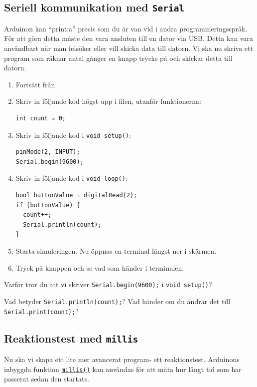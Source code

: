 \documentclass[11pt]{article}
\begin{document}
\newpage
\subsection{Seriell kommunikation med \texttt{Serial}}\label{sec:serial}
Arduinon kan ``print:a'' precis som du är van vid i andra programmeringsspråk.
För att göra detta måste den vara ansluten till en dator via USB. Detta kan
vara
användbart när man felsöker eller vill skicka data till datorn. Vi ska nu
skriva ett program som räknar antal gånger en knapp trycks på och skickar detta
till datorn.

\begin{enumerate}
      \item
            Fortsätt från 
      \item Skriv in följande kod högst upp i filen, utanför funktionerna:
            \begin{lstlisting}
int count = 0;
            \end{lstlisting}
      \item Skriv in följande kod i \texttt{void setup()}:
            \begin{lstlisting}
pinMode(2, INPUT);
Serial.begin(9600);
            \end{lstlisting}
      \item Skriv in följande kod i \texttt{void loop()}:
            \begin{lstlisting}
bool buttonValue = digitalRead(2);
if (buttonValue) {
  count++;
  Serial.println(count);
}
            \end{lstlisting}
      \item Starta simuleringen. Nu öppnas en terminal längst ner i skärmen.
      \item Tryck på knappen och se vad som händer i terminalen.
\end{enumerate}
\vspace{1em}
Varför tror du att vi skriver \texttt{Serial.begin(9600);} i \texttt{void
      setup()}?

Vad betyder \texttt{Serial.println(count);}? Vad händer om du ändrar det till
\texttt{Serial.print(count);}?

\newpage
\subsection{Reaktionstest med \texttt{millis}}
Nu ska vi skapa ett lite mer avancerat program- ett reaktionstest.
Arduinons inbyggda funktion
\texttt{\href{https://www.arduino.cc/reference/en/language/functions/time/millis/}{millis()}}
kan användas för att mäta hur långt tid som har passerat sedan den startats.
\end{document}
